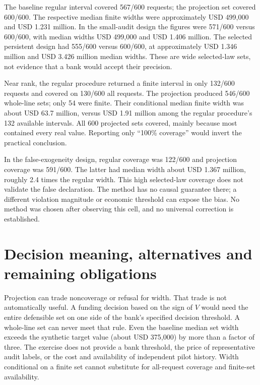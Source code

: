 \documentclass[11pt,a4paper]{article}
\begin{document}


The baseline regular interval covered 567/600 requests; the projection set
covered 600/600. The respective median finite widths were approximately
USD 499,000 and USD 1.231 million. In the small-audit design the figures were
571/600 versus 600/600, with median widths USD 499,000 and USD 1.406 million.
The selected persistent design had 555/600 versus 600/600, at approximately
USD 1.346 million and USD 3.426 million median widths. These are wide
selected-law sets, not evidence that a bank would accept their precision.

Near rank, the regular procedure returned a finite interval in only 132/600
requests and covered on 130/600 all requests. The projection produced 546/600
whole-line sets; only 54 were finite. Their conditional median finite width
was about USD 63.7 million, versus USD 1.91 million among the regular
procedure's 132 available intervals. All 600 projected sets covered, mainly
because most contained every real value. Reporting only ``100\% coverage''
would invert the practical conclusion.

In the false-exogeneity design, regular coverage was 122/600 and projection
coverage was 591/600. The latter had median width about USD 1.367 million,
roughly 2.4 times the regular width. This high selected-law coverage does not
validate the false declaration. The method has no causal guarantee there;
a different violation magnitude or economic threshold can expose the bias.
No method was chosen after observing this cell, and no universal correction
is established.

\section{Decision meaning, alternatives and remaining obligations}

Projection can trade noncoverage or refusal for width. That trade is not
automatically useful. A funding decision based on the sign of $V$ would need
the entire defensible set on one side of the bank's specified decision
threshold. A whole-line set can never meet that rule. Even the baseline median
set width exceeds the synthetic target value (about USD 375,000) by more than
a factor of three. The exercise does not provide a bank threshold, the price
of representative audit labels, or the cost and availability of independent
pilot history. Width conditional on a finite set cannot substitute for
all-request coverage and finite-set availability.
\end{document}
